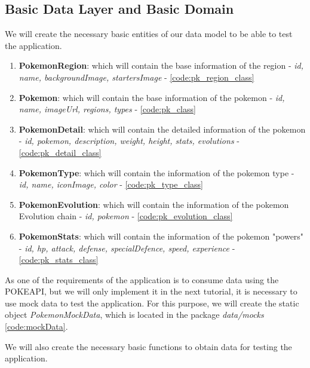 \documentclass[a4paper, 12pt]{article}
\begin{document}
\subsection{Basic Data Layer and Basic Domain}

We will create the necessary basic entities of our data model to be able to test the application.

\begin{enumerate}
    \item \textbf{PokemonRegion}:  which will contain the base information of the region - \textit{id, name, backgroundImage, startersImage} - \ref{code:pk_region_class}
    \item \textbf{Pokemon}: which will contain the base information of the pokemon - \textit{id, name, imageUrl, regions, types} - \ref{code:pk_class}
    \item \textbf{PokemonDetail}: which will contain the detailed information of the pokemon - \textit{id, pokemon, description, weight, height, stats, evolutions} - \ref{code:pk_detail_class}
    \item \textbf{PokemonType}: which will contain the information of the pokemon type - \textit{id, name, iconImage, color} - \ref{code:pk_type_class}
    \item \textbf{PokemonEvolution}: which will contain the information of the pokemon Evolution chain - \textit{id, pokemon} - \ref{code:pk_evolution_class}
    \item \textbf{PokemonStats}: which will contain the information of the pokemon "powers" - \textit{id, hp, attack, defense, specialDefence, speed, experience} - \ref{code:pk_stats_class}
\end{enumerate}

As one of the requirements of the application is to consume data using the POKEAPI, but we will only implement it in the next tutorial, it is necessary to use mock data to test the application. 
For this purpose, we will create the static object \textit{PokemonMockData}, which is located in the package \textit{data/mocks} \ref{code:mockData}.


We will also create the necessary basic functions to obtain data for testing the application.
\end{document}
